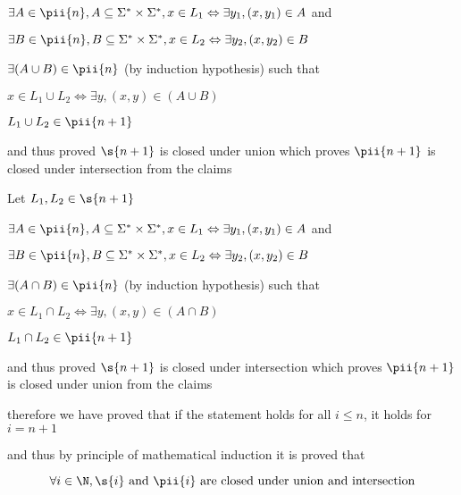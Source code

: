 \imp
$\exists A \in \pii{n}, A \subseteq \Sigma^* \times \Sigma^*, x \in L_1 \Leftrightarrow \exists y_1, (x, y_1) \in A$ and

$\exists B \in \pii{n}, B \subseteq \Sigma^* \times \Sigma^*, x \in L_2 \Leftrightarrow \exists y_2, (x, y_2) \in B$


\imp
$\exists (A \cup B) \in \pii{n}$ (by induction hypothesis) such that 

$
x \in L_1 \cup L_2 \Leftrightarrow \exists y, (x, y) \in (A \cup B)$

\imp
$L_1 \cup L_2 \in \pii{n + 1}$

and thus proved $\s{n + 1}$ is closed under union which proves $\pii{n + 1}$ is closed under intersection from the claims

Let $L_1, L_2 \in \s{n + 1}$

\imp
$\exists A \in \pii{n}, A \subseteq \Sigma^* \times \Sigma^*, x \in L_1 \Leftrightarrow \exists y_1, (x, y_1) \in A$ and

$\exists B \in \pii{n}, B \subseteq \Sigma^* \times \Sigma^*, x \in L_2 \Leftrightarrow \exists y_2, (x, y_2) \in B$


\imp
$\exists (A \cap B) \in \pii{n}$ (by induction hypothesis) such that 

$
x \in L_1 \cap L_2 \Leftrightarrow \exists y, (x, y) \in (A \cap B)$

\imp
$L_1 \cap L_2 \in \pii{n + 1}$


and thus proved $\s{n + 1}$ is closed under intersection which proves $\pii{n + 1}$ is closed under union from the claims

therefore we have proved that if the statement holds for all $i \leq n$, it holds for $i = n + 1$

and thus by principle of mathematical induction it is proved that 

$$
\forall i \in \N, \s{i} \text{ and } \pii{i} \text{ are closed under union and intersection}
$$


















